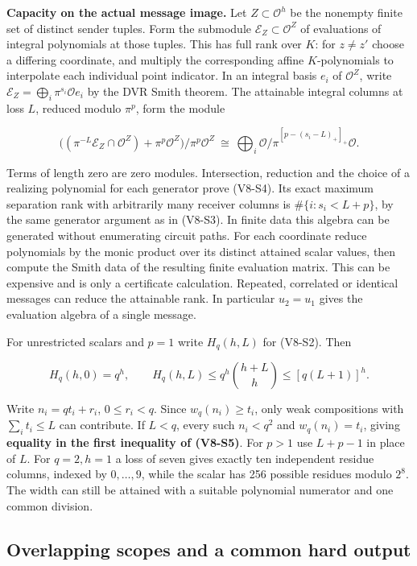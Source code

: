 \documentclass[
  11pt,
]{article}
\begin{document}
\textbf{Capacity on the actual message image.} Let
\(Z\subset\mathcal O^h\) be the nonempty finite set of distinct sender
tuples. Form the submodule \(\mathcal E_Z\subset\mathcal O^Z\) of
evaluations of integral polynomials at those tuples. This has full rank
over \(K\): for \(z\ne z'\) choose a differing coordinate, and multiply
the corresponding affine \(K\)-polynomials to interpolate each
individual point indicator. In an integral basis \(e_i\) of
\(\mathcal O^Z\), write
\(\mathcal E_Z=\bigoplus_i \pi^{s_i}\mathcal O e_i\) by the DVR Smith
theorem. The attainable integral columns at loss \(L\), reduced modulo
\(\pi^p\), form the module

\[
 \big((\pi^{-L}\mathcal E_Z\cap\mathcal O^Z)+\pi^p\mathcal O^Z\big)/
                   \pi^p\mathcal O^Z
 \ \cong\ \bigoplus_i \mathcal O/\pi^{[p-(s_i-L)_+]_+}\mathcal O.       \tag{V8-S4}
\]

Terms of length zero are zero modules. Intersection, reduction and the
choice of a realizing polynomial for each generator prove (V8-S4). Its
exact maximum separation rank with arbitrarily many receiver columns is
\(\#\{i:s_i<L+p\}\), by the same generator argument as in (V8-S3). In
finite data this algebra can be generated without enumerating circuit
paths. For each coordinate reduce polynomials by the monic product over
its distinct attained scalar values, then compute the Smith data of the
resulting finite evaluation matrix. This can be expensive and is only a
certificate calculation. Repeated, correlated or identical messages can
reduce the attainable rank. In particular \(u_2=u_1\) gives the
evaluation algebra of a single message.

For unrestricted scalars and \(p=1\) write \(H_q(h,L)\) for (V8-S2). Then

\[
 H_q(h,0)=q^h,\qquad
 H_q(h,L)\le q^h {h+L\choose h}\le [q(L+1)]^h.                      \tag{V8-S5}
\]

Write \(n_i=q t_i+r_i\), \(0\le r_i<q\). Since \(w_q(n_i)\ge t_i\), only
weak compositions with \(\sum_i t_i\le L\) can contribute. If \(L<q\),
every such \(n_i<q^2\) and \(w_q(n_i)=t_i\), giving \textbf{equality in
the first inequality of (V8-S5)}. For \(p>1\) use \(L+p-1\) in place of
\(L\). For \(q=2,h=1\) a loss of seven gives exactly ten independent
residue columns, indexed by \(0,\ldots,9\), while the scalar has 256
possible residues modulo \(2^8\). The width can still be attained with a
suitable polynomial numerator and one common division.

\subsection{Overlapping scopes and a common hard
output}\label{v8-overlapping-scopes-and-a-common-hard-output}
\end{document}
